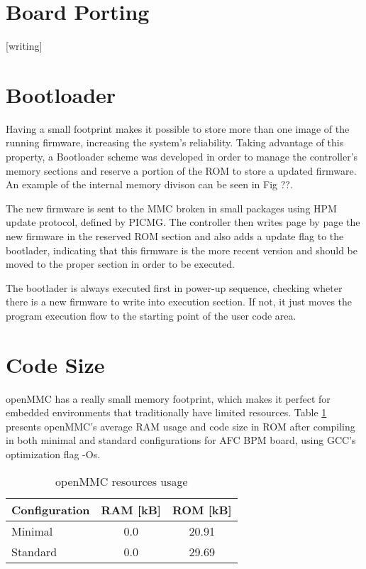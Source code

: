 \documentclass[a4paper,
              ]{jacow}
\begin{document}
\section{Board Porting}
[writing]

\section{Bootloader}
Having a small footprint makes it possible to store more than one image of the running firmware, increasing the system's reliability. Taking advantage of this property, a Bootloader scheme was developed in order to manage the controller's memory sections and reserve a portion of the ROM to store a updated firmware. An example of the internal memory divison can be seen in Fig ??.


The new firmware is sent to the MMC broken in small packages using HPM update protocol, defined by PICMG.
The controller then writes page by page the new firmware in the reserved ROM section and also adds a update flag to the bootlader, indicating that this firmware is the more recent version and should be moved to the proper section in order to be executed.

The bootlader is always executed first in power-up sequence, checking wheter there is a new firmware to write into execution section. If not, it just moves the program execution flow to the starting point of the user code area.

\section{Code Size}
openMMC has a really small memory footprint, which makes it perfect for embedded environments that traditionally have limited resources.
Table \ref{table:mem_usage} presents openMMC's average RAM usage and code size in ROM after compiling in both minimal and standard configurations for AFC BPM board, using GCC's optimization flag -Os.

\begin{table}[hbt]
  \centering
  \caption{openMMC resources usage}
  \label{table:mem_usage}
  \begin{tabular}{lcc}
    \toprule
    \textbf{Configuration} & \textbf{RAM [kB]} & \textbf{ROM [kB]} \\
    \midrule
    Minimal                & 0.0               & 20.91  \\
    Standard               & 0.0               & 29.69  \\
       \bottomrule
  \end{tabular}
\end{table}
\end{document}
